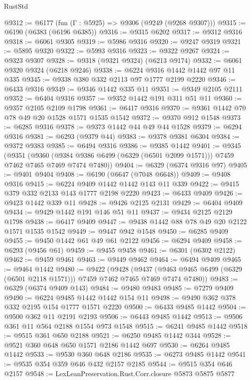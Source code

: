 \begin{lexlean}{RustStd}
\begin{coremodule}
{{@9312 := @6177 (fun (Γ : @5925) => @9306 (@9249 (@9268 @9307)))
@9315 := @6190 (@6383 (@6196 @6385))
@9316 := @9315 @6202
@9317 := @9312 @9316
@9318 := @6061 @9305
@9319 := @5986 @9316
@9320 := @9247 @9319
@9321 := @5895 @9320
@9322 := @5993 @9316
@9323 := @9322 @9267
@9324 := @9323 @9307
@9328 := @9318 (@9321 @9324) (@6213 @9174)
@9332 := @6061 @9320 @9324 (@6218 @9246)
@9338 := @6224 @9316 @1442 @1442 @97 @11 @335
@9345 := @9338 @380 @332 @2113 @97 @1777 @2199 @2220
@9346 := @6433 @9316
@9349 := @9346 @1442 @335 @11
@9351 := @9349 @2105 @2111
@9352 := @6404 @9316
@9357 := @9352 @1442 @191 @311 @51 @11
@9360 := @9357 @2105 @2109 @1798
@9361 := @6417 @9316
@9370 := @9361 @1442 @70 @78 @49 @20 @1528 @1571 @1535 @1542
@9372 := @9370 @912 @1548
@9373 := @6285 @9316
@9378 := @9373 @1442 @44 @49 @44 @1528
@9379 := @6294 @9316
@9381 := @6293 (@9379 @44)
@9383 := @9378 @9381 @6304
@9384 := @9372 @9383
@9385 := @6494 @9316
@9386 := @9385 @1442
@9401 := @9345
    (@9351
      (@9360 (@9384 @9386 @6499 (@6329 (@6501 @2099 @1571))) @7459 @7462 @7465 @7469 @7474 @7480))
@9404 := @6329 (@6374 @9316 @97)
@9405 := @9401 @9404
@9408 := @6190 (@6647 (@7048 @6648))
@9409 := @9408 @9316
@9415 := @6224 @9409 @1442 @1442 @143 @11 @339
@9422 := @9415 @379 @332 @2133 @143 @1777 @2198 @2220
@9423 := @6433 @9409
@9426 := @9423 @1442 @339 @11
@9428 := @9426 @2125 @2131
@9429 := @6404 @9409
@9434 := @9429 @1442 @191 @146 @51 @11
@9437 := @9434 @2125 @2129 @1798
@9438 := @6417 @9409
@9447 := @9438 @1442 @88 @78 @49 @20 @2122 @1571 @1535 @1542
@9449 := @9447 @942 @1548
@9450 := @6285 @9409
@9455 := @9450 @1442 @61 @49 @61 @2122
@9456 := @6294 @9409
@9458 := @6293 (@9456 @61)
@9459 := @9455 @9458
@9461 := @6301 (@6302 @2122)
@9462 := @9459 @9461
@9463 := @9449 @9462
@9464 := @6494 @9409
@9465 := @9464 @1442
@9480 := @9422
    (@9428
      (@9437 (@9463 @9465 @6499 (@6329 (@6501 @2118 @1571))) @7459 @7462 @7465 @7469 @7474 @7480))
@9483 := @6329 (@6374 @9409 @143)
@9484 := @9480 @9483
@9485 := @7279 @9409
@9490 := @6224 @9485 @1442 @1442 @154 @11
@9498 := @9490 @362 @378 @332 @2195 @154 @1777 @1571 @2220
@9500 := @6433 @9485 @1442
@9504 := @9500 @362 @11 @2191 @2193
@9506 := @6443 @9485 @1442
@9513 := @9506 @361 @11 @564 @2188 @1554 @973 @1548
@9515 := @6241 @9485 @1442
@9518 := @9515 @361 @650 @2188
@9521 := @6250 @9485 @1442 @344
@9528 := @9521 @360 @648 @650 @1571 @2186 @1442 @697
@9530 := @6264 @9485 @1442
@9533 := @9530 @360 @648 @2186
@9535 := @6273 @9485 @1442
@9541 := @9535 @354 @359 @646 @432 @2157 @2185
@9544 := @9515 @354 @646 @2157
@9548 := LexLeanPreservation.Rust.Corr.closure @5873 @5875 @5877
}}
\end{coremodule}
\end{lexlean}
